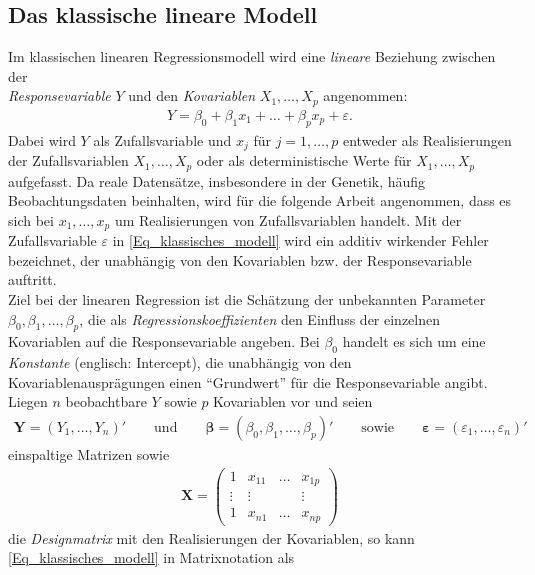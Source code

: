 \documentclass[12pt, a4paper]{report}\usepackage[]{graphicx}\usepackage[]{color}
\begin{document}
\subsection{Das klassische lineare Modell}\label{Kap_Das klassische lineare Modell}
Im klassischen linearen Regressionsmodell wird eine \textit{lineare} Beziehung zwischen der \\ \textit{Responsevariable} $Y$ und den \textit{Kovariablen} $X_1, \dots, X_p$ angenommen:
\begin{align}\label{Eq_klassisches_modell}
Y=\beta_0 + \beta_1 x_1 + \dots + \beta_p x_p + \varepsilon.
\end{align}
Dabei wird $Y$ als Zufallsvariable und $x_j$ für $j=1,\dots,p$ entweder als Realisierungen der Zufallsvariablen $X_1,\dots,X_p$ oder als deterministische Werte für $X_1,\dots,X_p$ aufgefasst. Da reale Datensätze, insbesondere in der Genetik, häufig Beobachtungsdaten beinhalten, wird für die folgende Arbeit angenommen, dass es sich bei $x_1,\dots,x_p$ um Realisierungen von Zufallsvariablen handelt. Mit der Zufallsvariable $\varepsilon$ in \eqref{Eq_klassisches_modell} wird ein additiv wirkender Fehler bezeichnet, der unabhängig von den Kovariablen bzw. der Responsevariable auftritt.\\
Ziel bei der linearen Regression ist die Schätzung der unbekannten Parameter $\beta_0, \beta_1, \dots, \beta_p$, die als \textit{Regressionskoeffizienten} den Einfluss der einzelnen Kovariablen auf die Responsevariable angeben. Bei $\beta_0$ handelt es sich um eine \textit{Konstante} (englisch: Intercept), die unabhängig von den Kovariablenausprägungen einen "`Grundwert"' für die Responsevariable angibt. Liegen $n$ beobachtbare $Y$ sowie $p$ Kovariablen vor und seien
\begin{align*}
\mathbf{Y} = (Y_1,\dots,Y_n)'
\qquad \text{und} \qquad
\boldsymbol{\beta} = (\beta_0,\beta_1,\dots,\beta_p
)'
\qquad \text{sowie} \qquad
\boldsymbol{\varepsilon} = (\varepsilon_1,\dots,\varepsilon_n
)'
\end{align*}
einspaltige Matrizen sowie
\begin{align*}
\mathbf{X} = \begin{pmatrix}
1 & x_{11} & \dots & x_{1p}\\ 
\vdots & \vdots & &\vdots\\
1 & x_{n1} & \dots & x_{np}
\end{pmatrix}
\end{align*}
die \textit{Designmatrix} mit den Realisierungen der Kovariablen, so kann \eqref{Eq_klassisches_modell} in Matrixnotation als
\end{document}
